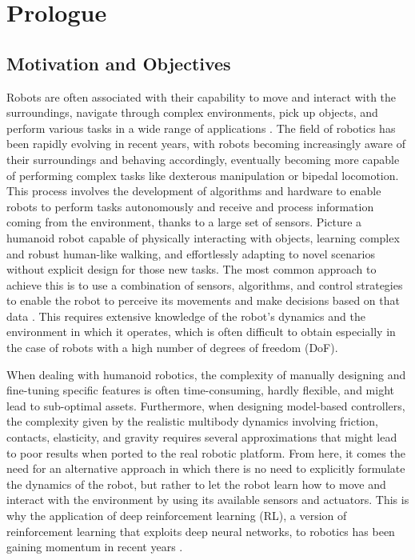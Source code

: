 \chapter*{Prologue}
\label{chp:00-Prologue}

\section*{Motivation and Objectives}

Robots are often associated with their capability to move and interact with the surroundings, navigate through complex environments, pick up objects, and perform various tasks in a wide range of applications \citep{article,zeng_robotic_2022}. The field of robotics has been rapidly evolving in recent years, with robots becoming increasingly aware of their surroundings and behaving accordingly, eventually becoming more capable of performing complex tasks like dexterous manipulation or bipedal locomotion. This process involves the development of algorithms and hardware to enable robots to perform tasks autonomously and receive and process information coming from the environment, thanks to a large set of sensors. Picture a humanoid robot capable of physically interacting with objects, learning complex and robust human-like walking, and effortlessly adapting to novel scenarios without explicit design for those new tasks.
The most common approach to achieve this is to use a combination of sensors, algorithms, and control strategies to enable the robot to perceive its movements and make decisions based on that data \citep{lara_embodied_2018, vaisi_review_2022}. This requires extensive knowledge of the robot's dynamics and the environment in which it operates, which is often difficult to obtain especially in the case of robots with a high number of degrees of freedom (\ac{DoF}).

When dealing with humanoid robotics, the complexity of manually designing and fine-tuning specific features is often time-consuming, hardly flexible, and might lead to sub-optimal assets. Furthermore, when designing model-based controllers, the complexity given by the realistic multibody dynamics involving friction, contacts, elasticity, and gravity requires several approximations that might lead to poor results when ported to the real robotic platform. From here, it comes the need for an alternative approach in which there is no need to explicitly formulate the dynamics of the robot, but rather to let the robot learn how to move and interact with the environment by using its available sensors and actuators. This is why the application of deep reinforcement learning (\ac{RL}), a version of reinforcement learning that exploits deep neural networks, to robotics has been gaining momentum in recent years \citep{golroudbari_recent_2023,li_reinforcement_2021}.

